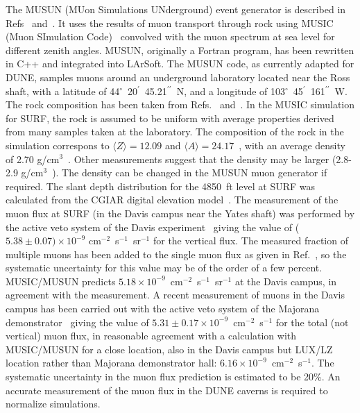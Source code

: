 The MUSUN (MUon Simulations UNderground) event generator is described in Refs~\cite{Kudryavtsev:2008qh}
and~\cite{Kudryavtsev:2003aua}.
It uses the results of muon transport through rock using 
MUSIC (Muon SImulation Code)~\cite{Antonioli:1997qw,Kudryavtsev:1999zu,Kudryavtsev:2008qh}
convolved with the muon spectrum at sea level for different zenith angles. 
MUSUN, originally a Fortran program, has been rewritten in C++ and integrated into LArSoft.
The MUSUN code, as currently adapted for DUNE, samples muons around an 
underground laboratory located near the Ross shaft, with a latitude of
44$^\circ$~20$^\prime$~45.21$^{\prime\prime}$~N, and a longitude of
103$^\circ$~45$^\prime$~161$^{\prime\prime}$~W. The rock composition has been
taken from Refs.~\cite{Mei:2009py} and~\cite{ref:ZhaoPrivateCommunication1}. 
In the MUSIC simulation for SURF, the rock is assumed to be uniform
with average properties derived from many samples taken at the laboratory. 
The composition of the rock in the simulation correspons to
$\langle Z\rangle = 12.09$ and $\langle A\rangle = 24.17$~\cite{Mei:2009py,ref:ZhaoPrivateCommunication1}, with
an average density of 2.70 g/cm$^{3}$~\cite{ref:ZhaoPrivateCommunication1}.
Other measurements suggest that the density may be larger (2.8-2.9 g/cm$^{3}$~\cite{Gray:2010nc,Heise:2014gta}). The
density can be changed in the MUSUN muon generator if required. The slant depth 
distribution for the 4850~ft level at SURF was calculated from the CGIAR digital elevation
model~\cite{ref:MartinRichardsonThesis}.
The measurement of the muon flux at SURF (in the Davis campus near the Yates shaft)
was performed by the active veto system of the Davis experiment~\cite{Cherry:1983dp} giving the value of
($5.38\pm0.07)\times10^{-9}$ cm$^{-2}$~s$^{-1}$~sr$^{-1}$ for the vertical flux.  
The measured fraction of multiple
muons has been added to the single muon flux as given in Ref.~\cite{Cherry:1983dp}, so the systematic
uncertainty for this value may be of the order of a few percent. MUSIC/MUSUN predicts
$5.18\times10^{-9}$~cm$^{-2}$~s$^{-1}$~sr$^{-1}$ at the Davis campus, in agreement with
the measurement. A recent measurement of muons in the Davis campus has been
carried out with the active veto system of the Majorana demonstrator~\cite{Abgrall:2016cfi} giving the
value of $5.31\pm0.17\times10^{-9}$~cm$^{-2}$~s$^{-1}$ for the total (not vertical) muon flux, in reasonable
agreement with a calculation with MUSIC/MUSUN for a close location, also in the Davis
campus but LUX/LZ location rather than Majorana demonstrator hall:
$6.16\times10^{-9}$~cm$^{-2}$~s$^{-1}$.   The systematic uncertainty in the muon flux prediction
is estimated to be 20\%.  An accurate measurement of the muon flux in the DUNE caverns
is required to normalize simulations.

